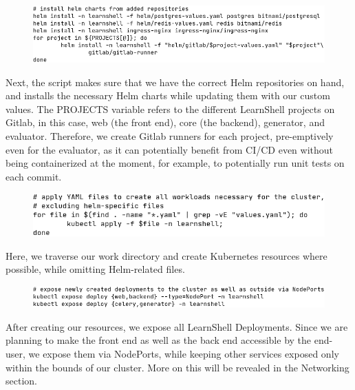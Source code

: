 \documentclass[thesis=B,english]{FITthesis}[2019/12/23]
\begin{document}
\begin{figure}[H]
\centering
\hspace*{-0.5cm}
\includegraphics[scale=0.5]{build-helm2}
\end{figure}

Next, the script makes sure that we have the correct Helm repositories on hand, and installs the necessary Helm charts while updating them with our custom values. The PROJECTS variable refers to the different LearnShell projects on Gitlab, in this case, web (the front end), core (the backend), generator, and evaluator. Therefore, we create Gitlab runners for each project, pre-emptively even for the evaluator, as it can potentially benefit from CI/CD even without being containerized at the moment, for example, to potentially run unit tests on each commit.

\begin{figure}[H]
\centering
\hspace*{-1.5cm}
\includegraphics[scale=0.5]{build-kube1}
\end{figure}

Here, we traverse our work directory and create Kubernetes resources where possible, while omitting Helm-related files. 

\begin{figure}[H]
\centering
\hspace*{-0.5cm}
\includegraphics[scale=0.5]{build-kube2}
\end{figure}

After creating our resources, we expose all LearnShell Deployments. Since we are planning to make the front end as well as the back end accessible by the end-user, we expose them via NodePorts, while keeping other services exposed only within the bounds of our cluster. More on this will be revealed in the Networking section.
\end{document}
